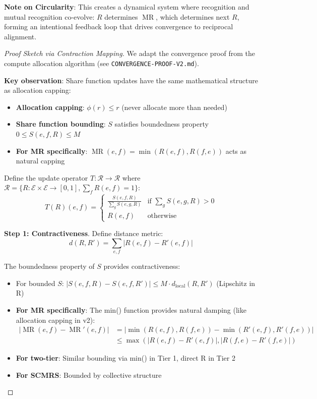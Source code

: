\documentclass[11pt,a4paper]{article}
\theoremstyle{definition}
\theoremstyle{remark}
\newcommand{\E}{\mathcal{E}}
\DeclareMathOperator{\MR}{MR}
\begin{document}
\textbf{Note on Circularity}: This creates a dynamical system where recognition and mutual recognition co-evolve: $R$ determines $\MR$, which determines next $R$, forming an intentional feedback loop that drives convergence to reciprocal alignment.

\begin{proof}[Proof Sketch via Contraction Mapping]
We adapt the convergence proof from the compute allocation algorithm (see \texttt{CONVERGENCE-PROOF-V2.md}).

\textbf{Key observation}: Share function updates have the same mathematical structure as allocation capping:
\begin{itemize}
\item \textbf{Allocation capping}: $\phi(r) \le r$ (never allocate more than needed)
\item \textbf{Share function bounding}: $S$ satisfies boundedness property $0 \le S(e,f,R) \le M$
\item \textbf{For MR specifically}: $\MR(e,f) = \min(R(e,f), R(f,e))$ acts as natural capping
\end{itemize}

Define the update operator $T: \mathcal{R} \to \mathcal{R}$ where $\mathcal{R} = \{R : \E \times \E \to [0,1], \sum_f R(e,f) = 1\}$:
\[ T(R)(e,f) = \begin{cases}
\frac{S(e,f,R)}{\sum_g S(e,g,R)} & \text{if } \sum_g S(e,g,R) > 0 \\
R(e,f) & \text{otherwise}
\end{cases} \]

\textbf{Step 1: Contractiveness}. Define distance metric:
\[ d(R, R') = \sum_{e,f} |R(e,f) - R'(e,f)| \]

The boundedness property of $S$ provides contractiveness:
\begin{itemize}
\item For bounded $S$: $|S(e,f,R) - S(e,f,R')| \le M \cdot d_{\text{local}}(R, R')$ (Lipschitz in R)
\item \textbf{For MR specifically}: The min() function provides natural damping (like allocation capping in v2):
\begin{align*}
|\MR(e,f) - \MR'(e,f)| &= |\min(R(e,f), R(f,e)) - \min(R'(e,f), R'(f,e))| \\
&\le \max(|R(e,f) - R'(e,f)|, |R(f,e) - R'(f,e)|)
\end{align*}
\item \textbf{For two-tier}: Similar bounding via min() in Tier 1, direct R in Tier 2
\item \textbf{For SCMRS}: Bounded by collective structure
\end{itemize}


\end{proof}
\end{document}
